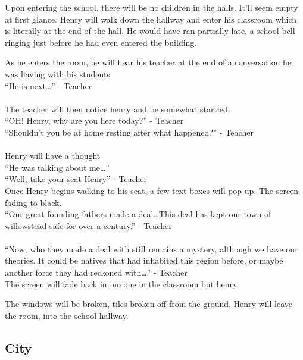 \documentclass[12pt, a4paper, titlepage]{article}
\begin{document}
            Upon entering the school, there will be no children in the halls. It'll seem empty at first glance. Henry will walk down the hallway and enter 
            his classroom which is literally at the end of the hall. He would have ran partially late, a school bell ringing just before he had even entered the building.
            
            As he enters the room, he will hear his teacher at the end of a conversation he was having with his students\\
            
            ``He is next\ldots'' - Teacher\\~\\
            The teacher will then notice henry and be somewhat startled.\\
            ``OH! Henry, why are you here today?'' - Teacher\\
            ``Shouldn't you be at home resting after what happened?'' - Teacher\\~\\
            Henry will have a thought\\
            ``He was talking about me\ldots''\\
            ``Well, take your seat Henry'' - Teacher\\
            Once Henry begins walking to his seat, a few text boxes will pop up. The screen fading to black.\\
            ``Our great founding fathers made a deal\ldots This deal has kept our town of willowstead safe for over a century.'' - Teacher\\~\\
            
            ``Now, who they made a deal with still remains a mystery, although we have our theories. It could be natives that had inhabited this region before, or maybe another force they had reckoned with\ldots'' - Teacher\\
            
            The screen will fade back in, no one in the classroom but henry. 
            
            The windows will be broken, tiles broken off from the ground. Henry will leave the room, into the school hallway. 
           
        \subsection{City}
        
\end{document}
